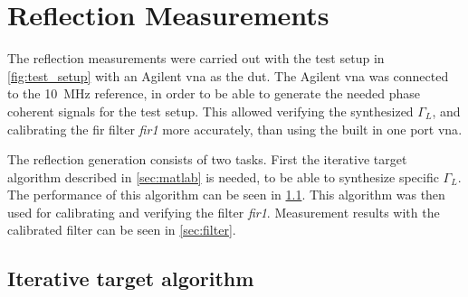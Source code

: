 \documentclass[12pt,a4paper,parskip=full,abstract=true,BCOR=12mm,twoside,open=right]{scrreprt}
\def\device#1{\textit{#1}}
\begin{document}

\section{Reflection Measurements}
\label{sec:reflection}

The reflection measurements were carried out with the test setup in \cref{fig:test_setup}
with an Agilent \gls{vna} as the \gls{dut}. The Agilent \gls{vna} was connected to the
\SI{10}{\mega\hertz} reference, in order to be able to generate the needed phase coherent
signals for the test setup. This allowed verifying the synthesized $\Gamma_L$, and
calibrating the \gls{fir} filter \device{fir1} more accurately, than using the built
in one port \gls{vna}.

The reflection generation consists of two tasks. First the iterative target algorithm
described in \cref{sec:matlab} is needed, to be able to synthesize specific $\Gamma_L$.
The performance of this algorithm can be seen in \cref{sec:iterative}. This
algorithm was then used for calibrating and verifying the filter \device{fir1}. Measurement
results with the calibrated filter can be seen in \cref{sec:filter}.

\subsection{Iterative target algorithm}
\label{sec:iterative}
\end{document}
